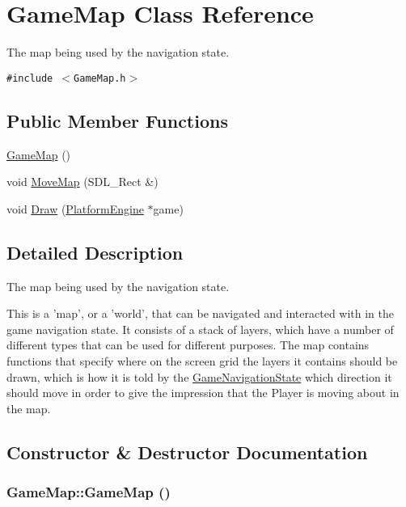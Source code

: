\hypertarget{class_game_map}{
\section{GameMap Class Reference}
\label{d4/de2/class_game_map}
}
The map being used by the navigation state.  


{\tt \#include $<$GameMap.h$>$}

\subsection*{Public Member Functions}
\begin{CompactItemize}
\item 
\hyperlink{class_game_map_ae71e5694cf19612fcaa4c1e21b03b71}{GameMap} ()
\item 
void \hyperlink{class_game_map_2be517853d4455e79a3c92c50e5f1722}{MoveMap} (SDL\_\-Rect \&)
\item 
void \hyperlink{class_game_map_c289ffedd32b98d2827e6b765b3e50d6}{Draw} (\hyperlink{class_platform_engine}{PlatformEngine} $\ast$game)
\end{CompactItemize}


\subsection{Detailed Description}
The map being used by the navigation state. 

This is a 'map', or a 'world', that can be navigated and interacted with in the game navigation state. It consists of a stack of layers, which have a number of different types that can be used for different purposes. The map contains functions that specify where on the screen grid the layers it contains should be drawn, which is how it is told by the \hyperlink{class_game_navigation_state}{GameNavigationState} which direction it should move in order to give the impression that the Player is moving about in the map. 

\subsection{Constructor \& Destructor Documentation}
\hypertarget{class_game_map_ae71e5694cf19612fcaa4c1e21b03b71}{
\subsubsection[{GameMap}]{\setlength{\rightskip}{0pt plus 5cm}GameMap::GameMap ()}}
\label{d4/de2/class_game_map_ae71e5694cf19612fcaa4c1e21b03b71}




